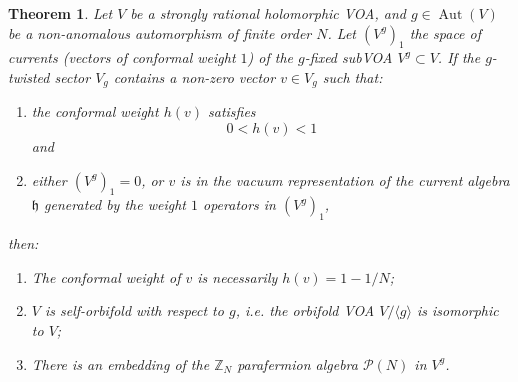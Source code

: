 \documentclass[11pt,reqno]{article}
\DeclareMathOperator{\Aut}{Aut}
\DeclareMathOperator{\Com}{Com}
\newcommand{\ZZ}{\mathbb{Z}}
\newcommand{\paraf}{\mathcal{P}}
\newcommand{\alg}[1]{\mathfrak{#1}}
\newtheorem{theorem}{Theorem}
\begin{document}
\begin{theorem}\label{th:paraf}
	Let $V$ be a strongly rational holomorphic VOA, and $g\in \Aut(V)$ be a non-anomalous automorphism of finite order $N$. Let $(V^g)_1$ the space of currents (vectors of conformal weight $1$) of  the $g$-fixed subVOA $V^g\subset V$. If the $g$-twisted sector $V_g$ contains a non-zero vector $v\in V_g$ such that:
	\begin{enumerate}
		\item the conformal weight $h(v)$ satisfies
		$$ 0<h(v)<1
		$$ and
		\item either $(V^g)_1=0$, or $v$ is in the vacuum representation of the current algebra $\alg{h}$ generated by the weight $1$ operators in $(V^g)_1$,
	\end{enumerate} then:
	\begin{enumerate}
		\item The conformal weight of $v$ is necessarily $h(v)=1-1/N$;
		\item $V$ is self-orbifold with respect to $g$, i.e. the orbifold VOA $V/\langle g\rangle$ is isomorphic to $V$;
		\item There is an embedding of the $\ZZ_N$ parafermion algebra $\paraf(N)$ in $V^g$. %
	\end{enumerate} 
\end{theorem}
\end{document}
